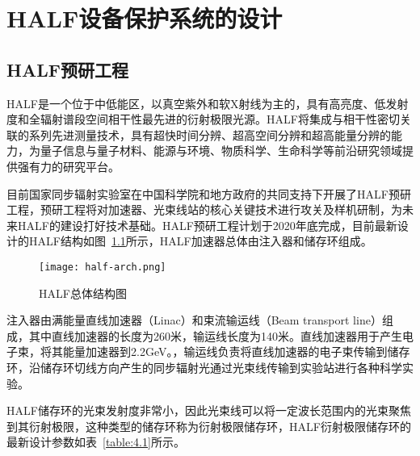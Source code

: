 
\chapter{HALF设备保护系统的设计}

\section{HALF预研工程}

HALF是一个位于中低能区，以真空紫外和软X射线为主的，具有高亮度、低发射度和全辐射谱段空间相干性最先进的衍射极限光源。HALF将集成与相干性密切关联的系列先进测量技术，具有超快时间分辨、超高空间分辨和超高能量分辨的能力，为量子信息与量子材料、能源与环境、物质科学、生命科学等前沿研究领域提供强有力的研究平台。

目前国家同步辐射实验室在中国科学院和地方政府的共同支持下开展了HALF预研工程，预研工程将对加速器、光束线站的核心关键技术进行攻关及样机研制，为未来HALF的建设打好技术基础。HALF预研工程计划于2020年底完成，目前最新设计的HALF结构如图~\ref{fig:half-arch}所示，HALF加速器总体由注入器和储存环组成。

\begin{figure}[!htb]
	\centering
	\texttt{[image: half-arch.png]}
	\caption{HALF总体结构图}
	\label{fig:half-arch}
\end{figure}

注入器由满能量直线加速器（Linac）和束流输运线（Beam transport line）组成，其中直线加速器的长度为260米，输运线长度为140米。直线加速器用于产生电子束，将其能量加速器到2.2GeV。，输运线负责将直线加速器的电子束传输到储存环，沿储存环切线方向产生的同步辐射光通过光束线传输到实验站进行各种科学实验。

HALF储存环的光束发射度非常小，因此光束线可以将一定波长范围内的光束聚焦到其衍射极限，这种类型的储存环称为衍射极限储存环，HALF衍射极限储存环的最新设计参数如表~\ref{table:4.1}所示。

